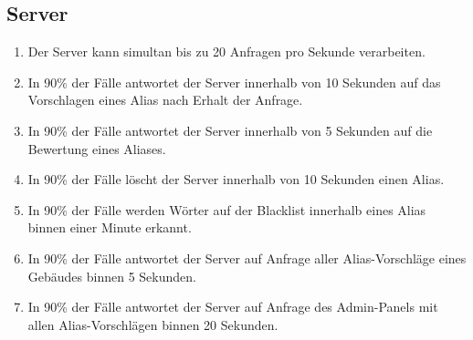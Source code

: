 \subsection{Server}

\begin{enumerate}
    \item Der Server kann simultan bis zu 20 Anfragen pro Sekunde verarbeiten.
    \item In 90\% der Fälle antwortet der Server innerhalb von 10 Sekunden auf das Vorschlagen eines Alias nach Erhalt der Anfrage.
    \item In 90\% der Fälle antwortet der Server innerhalb von 5 Sekunden auf die Bewertung eines Aliases.
    \item In 90\% der Fälle löscht der Server innerhalb von 10 Sekunden einen Alias.
    \item In 90\% der Fälle werden Wörter auf der Blacklist innerhalb eines Alias binnen einer Minute erkannt.
    \item In 90\% der Fälle antwortet der Server auf Anfrage aller Alias-Vorschläge eines Gebäudes binnen 5 Sekunden.
    \item In 90\% der Fälle antwortet der Server auf Anfrage des Admin-Panels mit allen Alias-Vorschlägen binnen 20 Sekunden.
\end{enumerate}